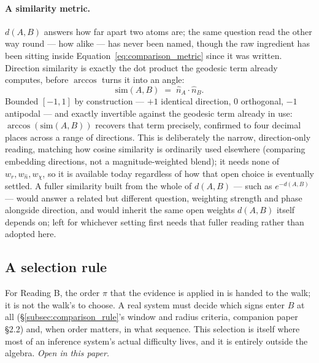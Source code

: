\documentclass[12pt, a4paper]{article}
\begin{document}
\paragraph{A similarity metric.} $d(A,B)$ answers how far apart two
atoms are; the same question read the other way round --- how alike
--- has never been named, though the raw ingredient has been sitting
inside Equation~\eqref{eq:comparison_metric} since it was written.
Direction similarity is exactly the dot product the geodesic term
already computes, before $\arccos$ turns it into an angle:
\begin{equation}
    \mathrm{sim}(A,B) \;=\; \hat n_A\cdot\hat n_B.
    \label{eq:direction_similarity}
\end{equation}
Bounded $[-1,1]$ by construction --- $+1$ identical direction, $0$
orthogonal, $-1$ antipodal --- and exactly invertible against the
geodesic term already in use: $\arccos(\mathrm{sim}(A,B))$ recovers
that term precisely, confirmed to four decimal places across a range
of directions. This is deliberately the narrow, direction-only
reading, matching how cosine similarity is ordinarily used elsewhere
(comparing embedding directions, not a magnitude-weighted blend); it
needs none of $w_r,w_{\hat n},w_\chi$, so it is available today
regardless of how that open choice is eventually settled. A fuller
similarity built from the whole of $d(A,B)$ --- such as $e^{-d(A,B)}$
--- would answer a related but different question, weighting
strength and phase alongside direction, and would inherit the same
open weights $d(A,B)$ itself depends on; left for whichever setting
first needs that fuller reading rather than adopted here.

\subsection{A selection rule}
\label{subsec:selection_rule}
For Reading B, the order $\pi$ that the evidence is applied in is
handed to the walk; it is not the walk's to choose. A real system must
decide which signs enter $B$ at all (\S\ref{subsec:comparison_rule}'s
window and radius criteria, companion paper \S2.2) and, when order
matters, in what sequence. This selection is itself where most of an
inference system's actual difficulty lives, and it is entirely outside
the algebra. \emph{Open in this paper.}
\end{document}
